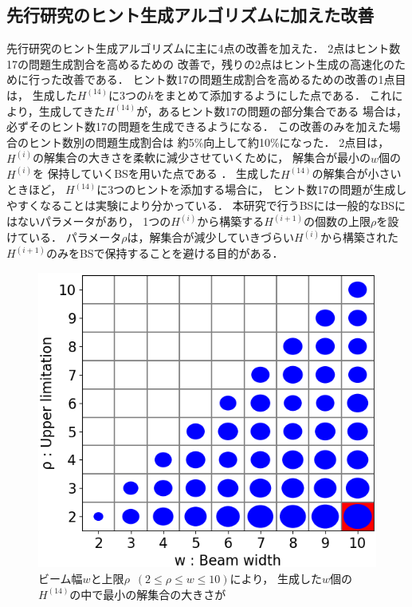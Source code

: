 \documentclass[a4paper, 9pt]{jarticle}
\begin{document}
\begin{論文概要}
\section{先行研究のヒント生成アルゴリズムに加えた改善}
先行研究のヒント生成アルゴリズムに主に4点の改善を加えた．
2点はヒント数17の問題生成割合を高めるための
改善で，残りの2点はヒント生成の高速化のために行った改善である．
ヒント数17の問題生成割合を高めるための改善の1点目は，
生成した$H^{(14)}$に3つの$h$をまとめて添加するようにした点である．
これにより，生成してきた$H^{(14)}$が，あるヒント数17の問題の部分集合である
場合は，必ずそのヒント数17の問題を生成できるようになる．
この改善のみを加えた場合のヒント数別の問題生成割合は
約5\%向上して約10\%になった．
2点目は，$H^{(i)}$の解集合の大きさを柔軟に減少させていくために，
解集合が最小の$w$個の$H^{(i)}$を
保持していくBSを用いた点である \cite{nagao}．
生成した$H^{(14)}$の解集合が小さいときほど，
$H^{(14)}$に3つのヒントを添加する場合に，
ヒント数17の問題が生成しやすくなることは実験により分かっている．
本研究で行うBSには一般的なBSにはないパラメータがあり，
1つの$H^{(i)}$から構築する$H^{(i+1)}$の個数の上限$\rho$を設けている．
パラメータ$\rho$は，解集合が減少していきづらい$H^{(i)}$から構築された
$H^{(i+1)}$のみをBSで保持することを避ける目的がある．
\begin{figure}[bt]
  \centering
  \includegraphics[keepaspectratio, scale=0.4]{best_beam_width_and_rho.png}
  \caption{ビーム幅$w$と上限$\rho$~$(2 \leq \rho \leq w \leq 10)$により，
  生成した$w$個の$H^{(14)}$の中で最小の解集合の大きさが
}
\end{figure}
\end{論文概要}
\end{document}

